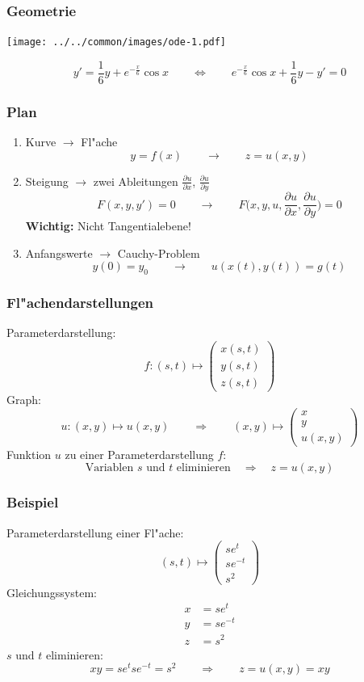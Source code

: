%
%
%
\begin{frame}
\frametitle{Geometrie}
\begin{center}
\texttt{[image: ../../common/images/ode-1.pdf]}
\end{center}
\[
y'=\frac16y+e^{-\frac{x}6}\cos x
\qquad\Leftrightarrow\qquad
e^{-\frac{x}6}\cos x
+
\frac16y
-
y'
=0
\]
\end{frame}

\begin{frame}
\frametitle{Plan}
\begin{enumerate}
\item Kurve
\pause
$\to$ Fl"ache
\[
y = f(x)
\qquad\to \qquad
z = u(x,y)
\]
\pause
\item Steigung
\pause
$\to$ zwei Ableitungen
$\displaystyle\frac{\partial u}{\partial x}$,
$\displaystyle\frac{\partial u}{\partial y}$
\[
F(x,y,y')=0
\qquad\to \qquad
F\biggl(x,y,u,\frac{\partial u}{\partial x},\frac{\partial u}{\partial y}
\biggr)=0
\]
\pause
{\bf Wichtig:} Nicht Tangentialebene!
\pause
\item Anfangswerte
\pause
$\to$ Cauchy-Problem
\[
y(0)=y_0
\qquad\to \qquad
u(x(t),y(t)) = g(t)
\]
\end{enumerate}
\end{frame}

\begin{frame}
\frametitle{Fl"achendarstellungen}
Parameterdarstellung:
\pause
\[
f\colon (s,t)\mapsto\begin{pmatrix}
x(s,t)\\y(s,t)\\z(s,t)
\end{pmatrix}
\]
\pause
Graph:
\pause
\[
u\colon (x,y)\mapsto u(x,y)
\qquad\Rightarrow\qquad
(x,y)\mapsto\begin{pmatrix}
x\\y\\u(x,y)
\end{pmatrix}
\]
\pause
Funktion $u$ zu einer Parameterdarstellung $f$:
\pause
\[
\text{Variablen $s$ und $t$ eliminieren}\quad\Rightarrow\quad
z=u(x,y)
\]
\end{frame}

\begin{frame}
\frametitle{Beispiel}
Parameterdarstellung einer Fl"ache:
\[
(s,t)\mapsto\begin{pmatrix}
se^t\\se^{-t}\\s^2
\end{pmatrix}
\]
Gleichungssystem:
\begin{align*}
x&=se^t\\
y&=se^{-t}\\
z&=s^2
\end{align*}
$s$ und $t$ eliminieren:
\[
xy=se^tse^{-t}=s^2
\qquad\Rightarrow\qquad
z=u(x,y)=xy
\]
\end{frame}

